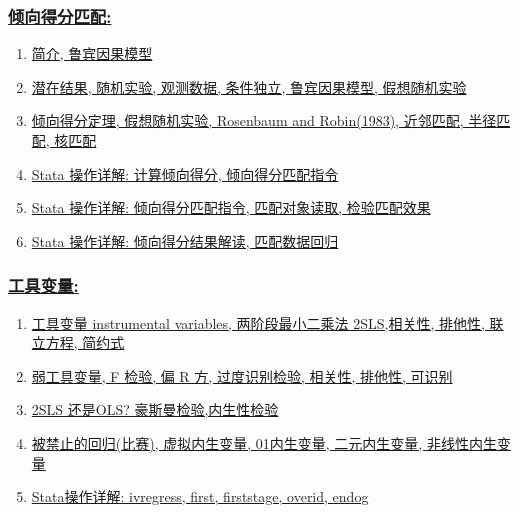 \documentclass[11pt]{article}
\begin{document}
\vspace{-1cm}

\subsubsection*{\href{https://space.bilibili.com/421438815/lists/813891?type=season}{\kaishu 倾向得分匹配:}}

\vspace{-0.5cm}

\begin{enumerate}
	\item \href{URLhttps://mp.weixin.qq.com/s/nqHhY8w6u1Od2Mfl6e97Fg}{简介, 鲁宾因果模型}
	\item \href{https://mp.weixin.qq.com/s/Uu3KEcNG3ECdbC8bL_NtKA}{潜在结果, 随机实验, 观测数据, 条件独立, 鲁宾因果模型, 假想随机实验}
	\item \href{https://mp.weixin.qq.com/s/gLDTBrMqyW93nOzYDJy6IQ}{倾向得分定理, 假想随机实验, Rosenbaum and Robin(1983), 近邻匹配, 半径匹配, 核匹配}
	\item \href{https://mp.weixin.qq.com/s/v0Kq34XXf0jGO0gtS-BTng}{Stata 操作详解: 计算倾向得分, 倾向得分匹配指令}
	\item \href{https://mp.weixin.qq.com/s/uUXJzggQCx--5i5vs_-_hw}{Stata 操作详解: 倾向得分匹配指令, 匹配对象读取, 检验匹配效果}
	\item \href{https://mp.weixin.qq.com/s/NvAopch22BI4-IJc07E0eg}{Stata 操作详解: 倾向得分结果解读, 匹配数据回归}
\end{enumerate}

\vspace{-1cm}

\subsubsection*{\href{https://space.bilibili.com/421438815/lists/1043569?type=season}{\kaishu 工具变量:}}

\vspace{-0.5cm}

\begin{enumerate}
	\item \href{https://mp.weixin.qq.com/s/ZT9hly47Fa3-Ag8YiwjS1A}{工具变量 instrumental variables, 两阶段最小二乘法 2SLS,相关性, 排他性, 联立方程, 简约式}
	\item \href{https://mp.weixin.qq.com/s/iMTV2k1a_cnAFDHwz8b04Q}{弱工具变量, F 检验, 偏 R 方, 过度识别检验, 相关性, 排他性, 可识别}
	\item \href{https://mp.weixin.qq.com/s/c0IGE8_P0R_E0BrJd9_GRw}{2SLS 还是OLS? 豪斯曼检验,内生性检验}
	\item \href{https://mp.weixin.qq.com/s/ymBux95BhKxKsXMrj7dGpg}{被禁止的回归(比赛), 虚拟内生变量, 01内生变量, 二元内生变量, 非线性内生变量}
	\item \href{https://mp.weixin.qq.com/s/-Qtk2aBJajDju1zYjHyRcg}{Stata操作详解: ivregress, first, firststage, overid, endog}
\end{enumerate}
\end{document}
